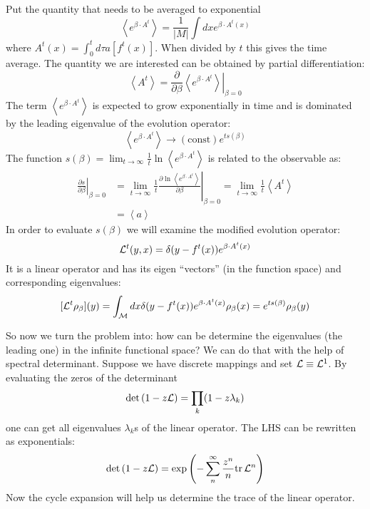 \begin{description}
Put the quantity that needs to be averaged to exponential
\[
\left\langle e^{\beta\cdot A^{t}}\right\rangle =\frac{1}{\vert M\vert}\int dxe^{\beta\cdot A^{t}(x)}
\]
where $A^{t}(x)=\int_{0}^{t}d\tau a[f^{t}(x)]$. When divided by $t$
this gives the time average. The quantity we are interested can be
obtained by partial differentiation:
\[
\left\langle A^{t}\right\rangle =\frac{\partial}{\partial\beta}\left.\left\langle e^{\beta\cdot A^{t}}\right\rangle \right|_{\beta=0}
\]
The term $\left\langle e^{\beta\cdot A^{t}}\right\rangle $ is expected
to grow exponentially in time and is dominated by the leading eigenvalue
of the evolution operator:
\[
\left\langle e^{\beta\cdot A^{t}}\right\rangle \to(\mathrm{const})e^{ts(\beta)}
\]
The function $s(\beta)=\lim_{t\to\infty}\frac{1}{t}\ln\left\langle e^{\beta\cdot A^{t}}\right\rangle $
is related to the observable as:
\begin{align*}
\left.\frac{\partial s}{\partial\beta}\right|_{\beta=0} & =\lim_{t\to\infty}\frac{1}{t}\left.
\frac{\partial\ln\left\langle e^{\beta\cdot A^{t}}\right\rangle }
     {\partial\beta}\right|_{\beta=0}
   =\lim_{t\to\infty}\frac{1}{t}\left\langle A^{t}\right\rangle \\
 & =\left\langle a\right\rangle
\end{align*}
In order to evaluate $s(\beta)$ we will examine the modified  evolution
operator:
\[
{\cal L}^{t}(y,x)=\delta(y-f^{t}(x))e^{\beta\cdot A^{t}(x)}
\]
It is a linear operator and has its eigen ``vectors'' (in the function
space) and corresponding eigenvalues:
\[
[{\cal L}^{t}\rho_{\beta}](y)=\int_{\mathcal{M}}dx\delta(y-f^{t}(x))e^{\beta\cdot A^{t}(x)}\rho_{\beta}(x)=e^{ts(\beta)}\rho_{\beta}(y)
\]

So now we turn the problem into: how can be determine the eigenvalues
(the leading one) in the infinite functional space? We can do that
with the help of spectral determinant. Suppose we have discrete mappings
and set ${\cal L}\equiv{\cal L}^{1}$. By evaluating the zeros
of the determinant
\[
\mbox{\rm det}\, (1-z{\cal L})=\prod_{k}(1-z \lambda_{k})
\]
one can get all eigenvalues $\lambda_{k}$s of the linear operator.
The LHS can be rewritten as exponentials:
\[
\mbox{\rm det}\, (1-z{\cal L})=\exp\left(-\sum_{n}^{\infty}\frac{z^{n}}{n}\mbox{\rm tr}\,  {\cal L}^{n}\right)
\]
Now the cycle expansion will help us determine the trace of the linear
operator.


\end{description}
